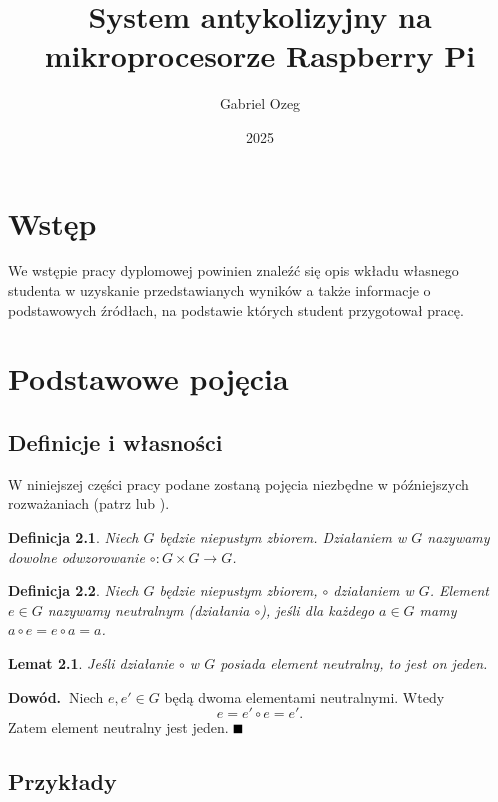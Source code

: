 \documentclass[magisterska]{pracadypl}
\author{Gabriel Ozeg}
\title{System antykolizyjny na mikroprocesorze Raspberry Pi}
\date{2025}
\def\pd{\noindent \textbf{Dowód.~}} %
\def\kd{\hfill\mbox{$\rule{2mm}{2mm}$}} %
\newtheorem{defi}{Definicja}[section]
\newtheorem{lem}{Lemat}[section]
\begin{document}
\maketitle
\tableofcontents
\newpage



\chapter{Wstęp}

We wstępie pracy dyplomowej powinien znaleźć się opis wkładu własnego studenta w uzyskanie przedstawianych wyników a także informacje o podstawowych źródłach, na podstawie których student przygotował pracę.


\chapter{Podstawowe pojęcia}

  \section{Definicje i własności}

  W niniejszej części pracy podane zostaną pojęcia niezbędne w późniejszych rozważaniach (patrz \cite{Kostrykin} lub \cite{Lang}).
  \begin{defi}
  Niech $G$ będzie niepustym zbiorem. Działaniem w $G$ nazywamy dowolne odwzorowanie $\circ:G\times G\to G$.
  \end{defi}

  \begin{defi}
  Niech $G$ będzie niepustym zbiorem, $\circ$ działaniem w $G$. Element $e\in G$ nazywamy neutralnym (działania $\circ$), jeśli dla każdego $a\in G$ mamy $a\circ e=e\circ a=a$.
  \end{defi}

  \begin{lem}\label{lem:element_neutralny}
  Jeśli działanie $\circ$ w $G$ posiada element neutralny, to jest on jeden.
  \end{lem}
  \pd Niech $e,e'\in G$ będą dwoma elementami neutralnymi. Wtedy
  \begin{equation}\label{eq:element_neutralny}
  e=e'\circ e=e'.
  \end{equation}
  Zatem element neutralny jest jeden. \kd


  \section{Przykłady}
\end{document}
